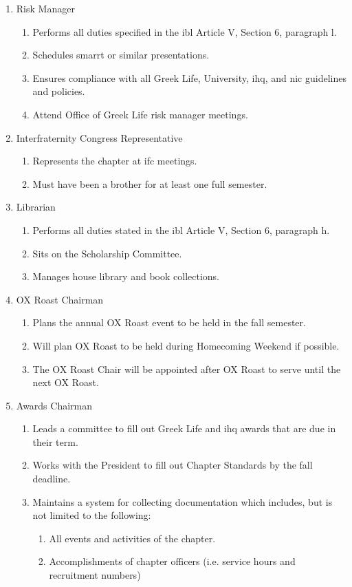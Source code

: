 \begin{enumerate}
				\item Risk Manager
					\begin{enumerate}
						\item Performs all duties specified in the \gls{ibl} Article V, Section 6, paragraph l.
						\item Schedules \gls{smarrt} or similar presentations.
						\item Ensures compliance with all Greek Life, University, \gls{ihq}, and \gls{nic} guidelines and policies.
						\item Attend Office of Greek Life risk manager meetings.
					\end{enumerate}

				\item Interfraternity Congress Representative
					\begin{enumerate}
						\item Represents the chapter at \gls{ifc} meetings.
						\item Must have been a brother for at least one full semester.
					\end{enumerate}

				\item Librarian
				\begin{enumerate}
					\item Performs all duties stated in the \gls{ibl} Article V, Section 6, paragraph h.
					\item Sits on the Scholarship Committee.
					\item Manages house library and book collections.
				\end{enumerate}

				\item OX Roast Chairman
					\begin{enumerate}
						\item Plans the annual OX Roast event to be held in the fall semester.
						\item Will plan OX Roast to be held during Homecoming Weekend if possible.
						\item The OX Roast Chair will be appointed after OX Roast to serve until the next OX Roast.
					\end{enumerate}

				\item Awards Chairman
					\begin{enumerate}
						\item Leads a committee to fill out Greek Life and \gls{ihq} awards that are due in their term.
						\item Works with the President to fill out Chapter Standards by the fall deadline.
						\item Maintains a system for collecting documentation which includes, but is not limited to the following:
							\begin{enumerate}
								\item All events and activities of the chapter.
								\item Accomplishments of chapter officers (i.e. service hours and recruitment numbers)
							\end{enumerate}
					\end{enumerate}


\end{enumerate}
